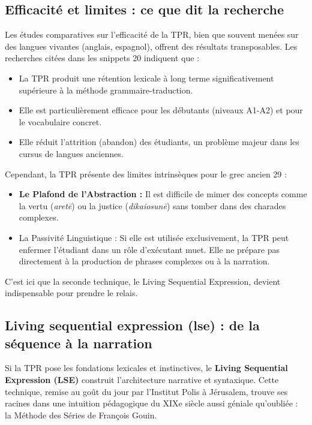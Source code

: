 \subsection{Efficacité et limites : ce que dit la recherche}

Les études comparatives sur l'efficacité de la TPR, bien que souvent menées sur des langues vivantes
(anglais, espagnol), offrent des résultats transposables. Les recherches citées dans les snippets 20
indiquent que :

\begin{itemize}\item La TPR produit une rétention lexicale à long terme significativement supérieure à la méthode grammaire-traduction.\item Elle est particulièrement efficace pour les débutants (niveaux A1-A2) et pour le vocabulaire concret.\item Elle réduit l'attrition (abandon) des étudiants, un problème majeur dans les cursus de langues anciennes.\cite{III-2-2-ref20}\end{itemize}Cependant, la TPR présente des limites intrinsèques pour le grec ancien 29 :

\begin{itemize}\item \textbf{Le Plafond de l'Abstraction :} Il est difficile de mimer des concepts comme \og la vertu\fg{} (\textit{aretē}) ou \og la justice\fg{} (\textit{dikaiosunē}) sans tomber dans des charades complexes.\item La Passivité Linguistique : Si elle est utilisée exclusivement, la TPR peut enfermer l'étudiant dans un rôle d'exécutant muet. Elle ne prépare pas directement à la production de phrases complexes ou à la narration.\end{itemize}C'est ici que la seconde technique, le Living Sequential Expression, devient indispensable pour
prendre le relais.



\subsection{Living sequential expression (lse) : de la séquence à la narration}

Si la TPR pose les fondations lexicales et instinctives, le \textbf{Living Sequential Expression
(LSE)} construit l'architecture narrative et syntaxique. Cette technique, remise au goût du jour par
l'Institut Polis à Jérusalem, trouve ses racines dans une intuition pédagogique du XIXe siècle aussi
géniale qu'oubliée : la \og Méthode des Séries\fg{} de François Gouin.



